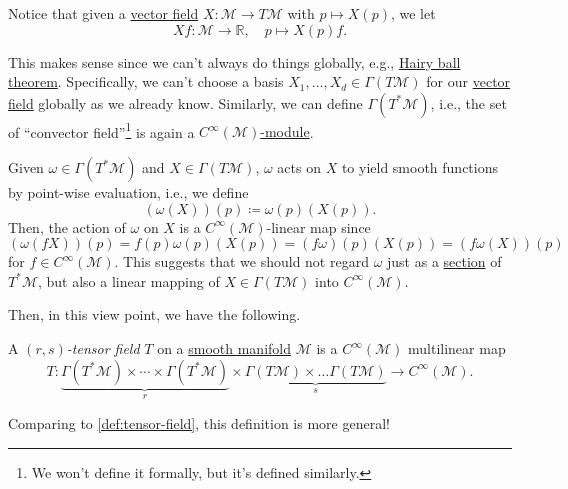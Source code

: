 \begin{notation}
	Notice that given a \hyperref[def:vector-field]{vector field} \(X\colon \mathcal{M} \to  T \mathcal{M} \) with \(p \mapsto X(p)\), we let
	\[
		Xf\colon \mathcal{M} \to \mathbb{R} ,\quad p \mapsto X(p) f.
	\]
\end{notation}

This makes sense since we can't always do things globally, e.g., \href{https://en.wikipedia.org/wiki/Hairy_ball_theorem}{Hairy ball theorem}. Specifically, we can't choose a basis \(X_1, \ldots , X_d\in \Gamma (T \mathcal{M} )\) for our \hyperref[def:vector-field]{vector field} globally as we already know. Similarly, we can define \(\Gamma (T^{\ast} \mathcal{M} )\), i.e., the set of ``convector field''\footnote{We won't define it formally, but it's defined similarly.} is again a \hyperref[def:module]{\(C^{\infty} (\mathcal{M} )\)-module}.

\begin{eg}
	Given \(\omega \in \Gamma (T^{\ast} \mathcal{M} )\) and \(X\in \Gamma (T \mathcal{M} )\), \(\omega \) acts on \(X\) to yield smooth functions by point-wise evaluation, i.e., we define
	\[
		\left( \omega (X) \right) (p) \coloneqq \omega (p) (X(p)).
	\]
	Then, the action of \(\omega \) on \(X\) is a \(C^{\infty} (\mathcal{M} )\)-linear map since
	\[
		(\omega (fX))(p)
		= f(p) \omega (p) (X(p))
		= (f \omega )(p) (X(p))
		= (f \omega (X))(p)
	\]
	for \(f\in C^\infty (\mathcal{M} )\). This suggests that we should not regard \(\omega \) just as a \hyperref[def:section]{section} of \(T^{\ast} \mathcal{M} \), but also a linear mapping of \(X\in \Gamma (T \mathcal{M} )\) into \(C^{\infty} (\mathcal{M} )\).
\end{eg}

Then, in this view point, we have the following.

\begin{definition}\label{def:tensor-field*}
	A \emph{\((r, s)\)-tensor field} \(T\) on a \hyperref[def:smooth-manifold]{smooth manifold} \(\mathcal{M} \) is a \(C^{\infty} (\mathcal{M} )\) multilinear map
	\[
		T \colon \underbrace{\Gamma (T ^{\ast} \mathcal{M} ) \times \cdots \times \Gamma (T ^{\ast} \mathcal{M} )}_{r} \times \underbrace{\Gamma (T \mathcal{M} ) \times \ldots \Gamma (T \mathcal{M} )}_{s} \to C^{\infty} (\mathcal{M} ).
	\]
\end{definition}

Comparing to \autoref{def:tensor-field}, this definition is more general!

